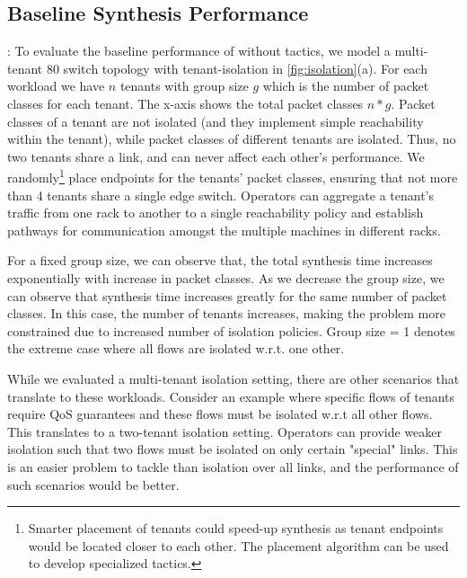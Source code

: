 \subsection{Baseline Synthesis Performance} \label{sec:baselineeval} 
: To evaluate the baseline
performance of \Name without tactics, we model a multi-tenant 80 switch
 topology with tenant-isolation in
\cref{fig:isolation}(a).  For each workload we have $n$ tenants with
group size $g$ which is the number of packet classes for each
tenant. The x-axis shows the total packet classes $n*g$.  Packet
classes of a tenant are not isolated (and they implement simple
reachability within the tenant), while packet classes of different
tenants are isolated. Thus, no two tenants share a link, and can never
affect each other's performance.  We randomly\footnote{ Smarter
  placement of tenants could speed-up synthesis as tenant endpoints
  would be located closer to each other. The placement algorithm can
  be used to develop specialized tactics.}  place endpoints for the
tenants' packet classes, ensuring that not more than 4 tenants share a
single edge switch.  Operators can aggregate a tenant's traffic from
one rack to another to a single reachability policy and establish
pathways for communication amongst the multiple machines in different
racks.

For a fixed group size, we can observe that, the total synthesis time
increases exponentially with increase in packet classes.  As we
decrease the group size, we can observe that synthesis time increases
greatly for the same number of packet classes.  In this case, the
number of tenants increases, making the problem more constrained due
to increased number of isolation policies.  Group size = 1 denotes the
extreme case where all flows are isolated w.r.t. one other.
 
While we evaluated a multi-tenant isolation setting, there are other
scenarios that translate to these workloads. Consider an example where
specific flows of tenants require QoS guarantees and these flows must
be isolated w.r.t all other flows. This translates to a two-tenant
isolation setting. Operators can provide weaker isolation such that
two flows must be isolated on only certain "special" links. 
This is an easier problem to tackle than isolation over all
links, and the performance of such scenarios would be better.

